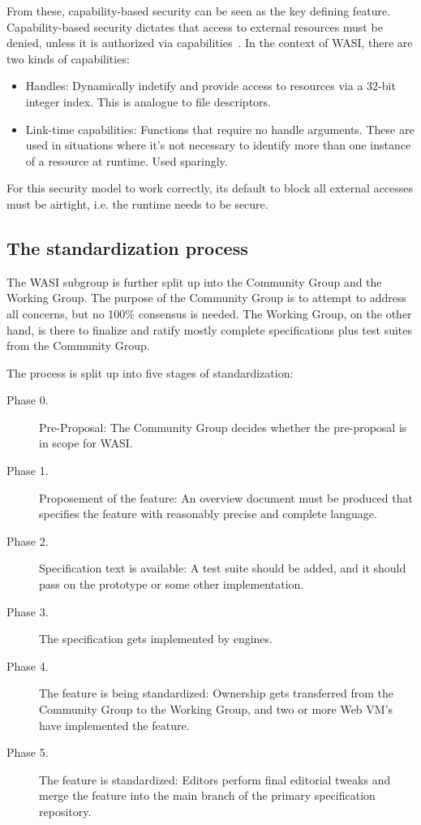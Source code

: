 From these, capability-based security can be seen as the key defining feature. Capability-based security dictates that access to external resources must be denied, unless it is authorized via capabilities~\cite{cap-security}. In the context of \gls{WASI}, there are two kinds of capabilities:

\begin{itemize}
    \item Handles: Dynamically indetify and provide access to resources via a 32-bit integer index. This is analogue to file descriptors.
    \item Link-time capabilities: Functions that require no handle arguments. These are used in situations where it's not necessary to identify more than one instance of a resource at runtime. Used sparingly.
\end{itemize}

For this security model to work correctly, its default to block all external accesses must be airtight, i.e. the runtime needs to be secure.

\subsection{The standardization process}

The \gls{WASI} subgroup is further split up into the Community Group and the Working Group. The purpose of the Community Group is to attempt to address all concerns, but no 100\% consensus is needed. The Working Group, on the other hand, is there to finalize and ratify mostly complete specifications plus test suites from the Community Group.


The process is split up into five stages of standardization:

\begin{description}
    \item[Phase 0.] Pre-Proposal: The Community Group decides whether the pre-proposal is in scope for \gls{WASI}.
    \item[Phase 1.] Proposement of the feature: An overview document must be produced that specifies the feature with reasonably precise and complete language.
    \item[Phase 2.] Specification text is available: A test suite should be added, and it should pass on the prototype or some other implementation.
    \item[Phase 3.] The specification gets implemented by engines.
    \item[Phase 4.] The feature is being standardized: Ownership gets transferred from the Community Group to the Working Group, and two or more Web \gls{VM}'s have implemented the feature.
    \item[Phase 5.] The feature is standardized: Editors perform final editorial tweaks and merge the feature into the main branch of the primary specification repository.

\end{description}


